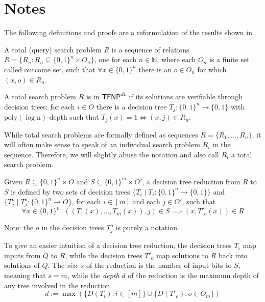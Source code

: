 \hypersetup{colorlinks=true, linkcolor=blue, citecolor=red}


\chapter{Notes} \label{chap:notes}

The following definitions and proofs are a reformulation of the results shown in \cite{tfnp_characterization, separations_proof_complexity,proofs_circuits_communication}

\begin{definition}
    A total (query) search problem $R$ is a sequence of relations $R = \{R_n : R_n \subseteq \{0,1\}^n \times O_n\}$, one for each $n \in \mathbb{N}$, where each $O_n$ is a finite set called outcome set, such that $\forall x \in \{0,1\}^n$ there is an $o \in O_n$ for which $(x,o) \in R_n$.

    A total search problem $R$ is in $\mathsf{TFNP}^{dt}$ if its solutions are verifiable through decision trees: for each $i \in O$ there is a decision tree $T_j : \{0,1\}^n \to \{0,1\}$ with $\mathrm{poly(\log n)}$-depth such that $T_j(x) = 1 \iff (x,j) \in R_n$.
\end{definition}

While total search problems are formally defined as sequences $R = \{R_1, \ldots, R_n\}$, it will often make sense to speak of an individual search problem $R_i$ in the sequence. Therefore, we will slightly abuse the notation and also call $R_i$ a total search problem.

\begin{definition}
    Given $R \subseteq \{0,1\}^n \times O$ and $S \subseteq \{0,1\}^m \times O'$, a decision tree reduction from $R$ to $S$ is defined by two sets of decision trees $\{T_i \mid T_i : \{0,1\}^n \to \{0,1\}\}$ and $\{T^o_j \mid T^o_j : \{0,1\}^n \to O\}$, for each $i \in [m]$ and each $j \in O'$, such that
    \[\forall x \in \{0,1\}^n \;\; ((T_1(x), \ldots, T_m(x)), j) \in S \implies (x, T'_o(x)) \in R\]

    \underline{Note}: the $o$ in the decision trees $T^o_j$ is purely a notation. 
\end{definition}

To give an easier intuition of a decision tree reduction, the decision trees $T_i$ map inputs from $Q$ to $R$, while the decision trees $T'_o$ map solutions to $R$ back into solutions of $Q$. The \textit{size} $s$ of the reduction is the number of input bits to $S$, meaning that $s = m$, while the \textit{depth} $d$ of the reduction is the maximum depth of any tree involved in the reduction
\[d := \max(\{D(T_i) : i \in [m]\} \cup \{D(T'_o) : o \in O_m\})\]

